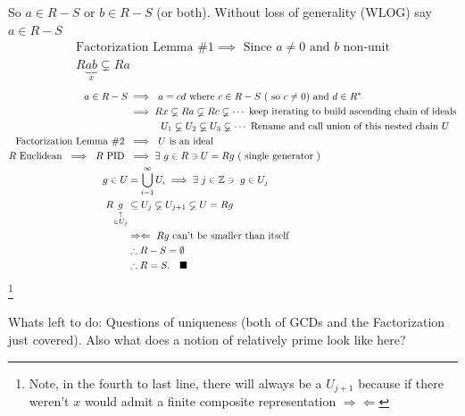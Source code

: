 \begin{lemma}
So $a\in R-S$ or $b\in R-S$ (or both). Without loss of generality (WLOG) say $a\in R-S$
\begin{align*}
    \text{Factorization Lemma \#1} \implies \text{ Since }a\neq 0 \text{ and }b \text{ non-unit}\\
    R\underbrace{ab}_{x}\varsubsetneq Ra
\end{align*} 
\begin{align*}
    a\in R-S &\implies \ a=cd \text{ where }c\in R-S \ (\text{ so }c\neq 0) \text{ and }d\in R^* \\
    &\implies Rx \varsubsetneq Ra \varsubsetneq Rc \varsubsetneq \cdots \text{ keep iterating to build ascending chain of ideals} \\
    &\ \ \ \ \ \ \ \ \ \ U_1 \varsubsetneq U_2 \varsubsetneq U_3 \varsubsetneq \cdots \text{ Rename and call union of this nested chain }U \\
    \text{Factorization Lemma \#2 }&\implies \ U \text{ is an ideal} \\
    R \text{ Euclidean }\implies \ R \text{ PID } &\implies \exists \ g\in R \ni U=Rg \ (\text{ single generator })\\
    g\in U &= \bigcup_{i=1}^\infty U_i \implies \exists \ j \in {\mathbb{ Z}} \ni \ g\in U_j  \\
    R\underset{\substack{\uparrow \\ \in U_j}}{g} &\subseteq U_j \varsubsetneq U_{j+1} \varsubsetneq U = Rg \\
    &\Rightarrow \Leftarrow \ Rg \text{ can't be smaller than itself} \\
    &\therefore R-S=\emptyset \\
    &\therefore R=S. \ \ \ \blacksquare 
\end{align*} \footnote{Note, in the fourth to last line, there will always be a $U_{j+1}$ because if there weren't $x$ would admit a finite composite representation $\Rightarrow \Leftarrow$ }
\end{lemma}

Whats left to do: Questions of uniqueness (both of GCDs and the Factorization just covered). Also what does a notion of relatively prime look like here?


